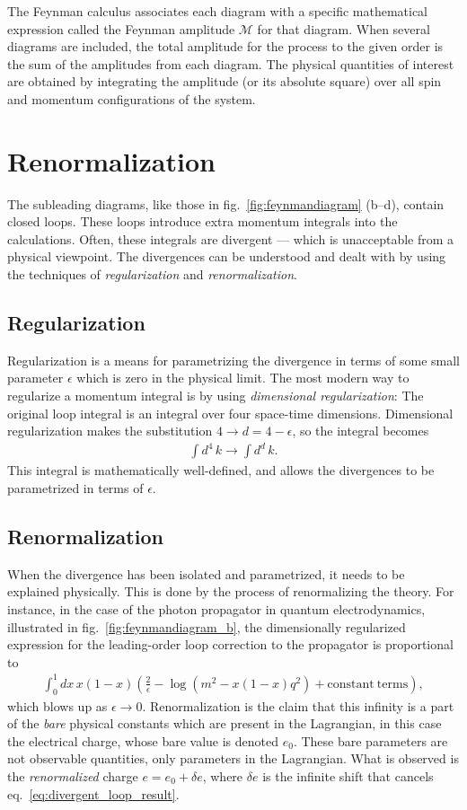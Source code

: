 \documentclass[twoside,english]{uiofysmaster}
\begin{document}
The Feynman calculus associates each diagram with a specific mathematical expression called the Feynman amplitude $\mathcal{M}$ for that diagram. When several diagrams are included, the total amplitude for the process to the given order is the sum of the amplitudes from each diagram. The physical quantities of interest are obtained by integrating the amplitude (or its absolute square) over all spin and momentum configurations of the system.

\section{Renormalization}
\label{sec:renormalization}
The subleading diagrams, like those in fig.\  \ref{fig:feynmandiagram} (b--d), contain closed loops. These loops introduce extra momentum integrals into the calculations. Often, these integrals are divergent --- which is unacceptable from a physical viewpoint. The divergences can be understood and dealt with by using the techniques of {\it regularization} and {\it renormalization}. 
\subsection{Regularization}
Regularization is a means for parametrizing the divergence in terms of some small parameter $\epsilon$ which is zero in the physical limit. The most modern way to regularize a momentum integral is by using {\it dimensional regularization}: The original loop integral is an integral over four space-time dimensions. Dimensional regularization makes the substitution $4 \to d = 4-\epsilon$, so the integral becomes
\begin{align}
	\int d^4 \, k \to \int d^d \, k.
\end{align}
This integral is mathematically well-defined, and allows the divergences to be parametrized in terms of $\epsilon$.
\subsection{Renormalization}
When the divergence has been isolated and parametrized, it needs to be explained physically. This is done by the process of renormalizing the theory. For instance, in the case of the photon propagator in quantum electrodynamics, illustrated in fig.\ \ref{fig:feynmandiagram_b}, the dimensionally regularized expression for the leading-order loop correction to the propagator is proportional to
\begin{align}
	\int_0^1 dx \, x (1-x) \left( \frac{2}{\epsilon} - \log \left(m^2 - x(1-x)q^2 \right) + \mathrm{constant~terms} \right), \label{eq:divergent_loop_result}
\end{align}
which blows up as $\epsilon\to 0$. Renormalization is the claim that this infinity is a part of the {\it bare} physical constants which are present in the Lagrangian, in this case the electrical charge, whose bare value is denoted $e_0$. These bare parameters are not observable quantities, only parameters in the Lagrangian. What is observed is the {\it renormalized} charge $e = e_0 + \delta e$, where $\delta e$ is the infinite shift that cancels eq.\ \eqref{eq:divergent_loop_result}.
\end{document}
